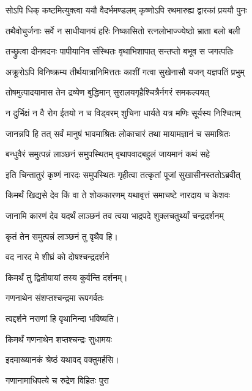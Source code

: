 \twolineshloka
{सोऽपि धिक् कष्टमित्युक्त्वा ययौ वैदर्भमण्डलम्}
{कृष्णोऽपि रथमारुह्य द्वारकां प्रययौ पुनः}%

\twolineshloka
{तथैवोचुर्जनाः सर्वे न साधीयानयं हरिः}
{निष्कासितो रत्नलोभाज्ज्येष्ठो भ्राता बलो बली}%

\twolineshloka
{तच्छ्रुत्वा दीनवदनः पापीयानिव संस्थितः}
{वृथाभिशापात् सन्तप्तो बभूव स जगत्पतिः}%

\twolineshloka
{अक्रूरोऽपि विनिष्क्रम्य तीर्थयात्रानिमित्ततः}
{काशीं गत्वा सुखेनासौ यजन् यज्ञपतिं प्रभुम्}%

\twolineshloka
{तोषमुत्पादयामास तेन द्रव्येण बुद्धिमान्}
{सुरालयगृहैश्चित्रैर्नगरं समकल्पयत्}%

\twolineshloka
{न दुर्भिक्षं न वै रोग ईतयो न च विड्वरम्}
{शुचिना धार्यते यत्र मणिः सूर्यस्य निश्चितम्}%

\twolineshloka
{जानन्नपि हि तत् सर्वं मानुषं भावमाश्रितः}
{लोकाचारं तथा मायामज्ञानं च समाश्रितः}%

\twolineshloka
{बन्धुवैरं समुत्पन्नं लाञ्छनं समुपस्थितम्}
{वृथापवादबहुलं जायमानं कथं सहे}%

\twolineshloka
{इति चिन्तातुरं कृष्णं नारदः समुपस्थितः}
{गृहीत्वा तत्कृतां पूजां सुखासीनस्ततोऽब्रवीत्}%


\twolineshloka
{किमर्थं खिद्यसे देव किं वा ते शोककारणम्}
{यथावृत्तं समाचष्टे नारदाय च केशवः}%


\twolineshloka
{जानामि कारणं देव यदर्थं लाञ्छनं तव}
{त्वया भाद्रपदे शुक्लचतुर्थ्यां चन्द्रदर्शनम्}%

{कृतं तेन समुत्पन्नं लाञ्छनं तु वृथैव हि।}


\onelineshloka
{वद नारद मे शीघ्रं को दोषश्चन्द्रदर्शने}%

{किमर्थं तु द्वितीयायां तस्य कुर्वन्ति दर्शनम्।}


\onelineshloka
{गणनाथेन संशप्तश्चन्द्रमा रूपगर्वतः}%

{त्वद्दर्शने नराणां हि वृथानिन्दा भविष्यति।}

\onelineshloka
{किमर्थं गणनाथेन शप्तश्चन्द्रः सुधामयः}%

{इदमाख्यानकं श्रेष्ठं यथावद् वक्तुमर्हसि।} 

\onelineshloka
{गणानामाधिपत्ये च रुद्रेण विहितः पुरा}%

